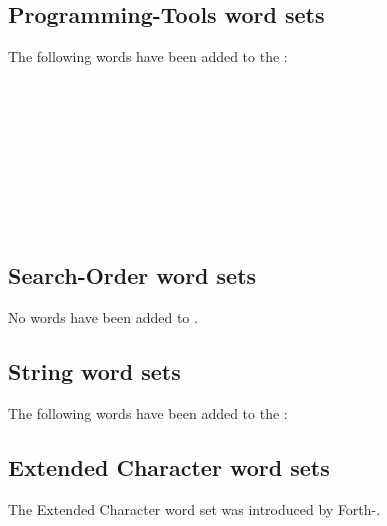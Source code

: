 \subsection{Programming-Tools word sets}
\label{diff:12:tools}
The following words have been added to the :

\begin{minipage}[t]{0.45\linewidth}
	 \\
	 \\
	 \\
	 \\
\end{minipage}
\hfill
\begin{minipage}[t]{0.45\linewidth}
	 \\
	 \\
	 \\
\end{minipage}

\subsection{Search-Order word sets}
No words have been added to .

\subsection{String word sets}
The following words have been added to the :

\begin{minipage}[t]{0.3\linewidth}
\end{minipage}
\hfill
\begin{minipage}[t]{0.3\linewidth}
\end{minipage}
\hfill
\begin{minipage}[t]{0.3\linewidth}
\end{minipage}

\subsection{Extended Character word sets}
The Extended Character word set was introduced by Forth-\snapshot.

